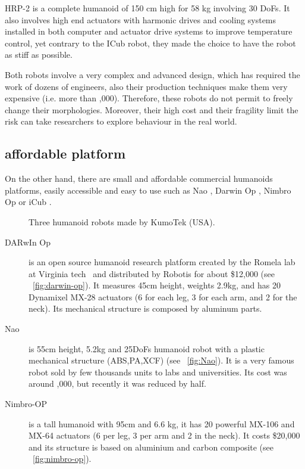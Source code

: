 HRP-2 is a complete humanoid of 150 cm high for 58 kg involving 30 DoFs. It also involves high end actuators with harmonic drives and cooling systems installed in both computer and actuator drive systems to improve temperature control, yet contrary to the ICub robot, they made the choice to have the robot as stiff as possible.

Both robots involve a very complex and advanced design, which has required the work of dozens of engineers, also their production techniques make them very expensive (i.e. more than ,000). Therefore, these robots do not permit to freely change their morphologies. Moreover, their high cost and their fragility limit the risk can take researchers to explore behaviour in the real world.



\subsection{affordable platform} %

On the other hand, there are small and affordable commercial humanoids platforms, easily accessible and easy to use such as Nao \cite{gouaillier2008nao}, Darwin Op \cite{ha2011development}, Nimbro Op \cite{schwarznimbro} or iCub \cite{metta2008icub}.

\begin{figure}[tb]
\centering
    \hfil
    \hfil
    \caption{Three humanoid robots made by KumoTek (USA).}
    \label{fig:kumotek_robots}
\end{figure}


\begin{description}
    \item[DARwIn Op] is an open source humanoid research platform created by the Romela lab at Virginia tech~\parencite{ha2011development} and distributed by Robotis for about \$12,000 (see \figurename~\ref{fig:darwin-op}). It measures 45cm height, weights 2.9kg, and has 20 Dynamixel MX-28 actuators (6 for each leg, 3 for each arm, and 2 for the neck). Its mechanical structure is composed by aluminum parts.
    \item[Nao] is 55cm height, 5.2kg and 25DoFs humanoid robot with a plastic mechanical structure (ABS,PA,XCF) (see \figurename~\ref{fig:Nao}). It is a very famous robot sold by few thousands units to labs and universities. Its cost was around ,000, but recently it was reduced by half.
    \item[Nimbro-OP] is a tall humanoid with 95cm and 6.6 kg, it has 20 powerful MX-106 and MX-64 actuators (6 per leg, 3 per arm and 2 in the neck). It costs \$20,000 and its structure is based on aluminium and carbon composite (see \figurename~\ref{fig:nimbro-op}).
\end{description}

